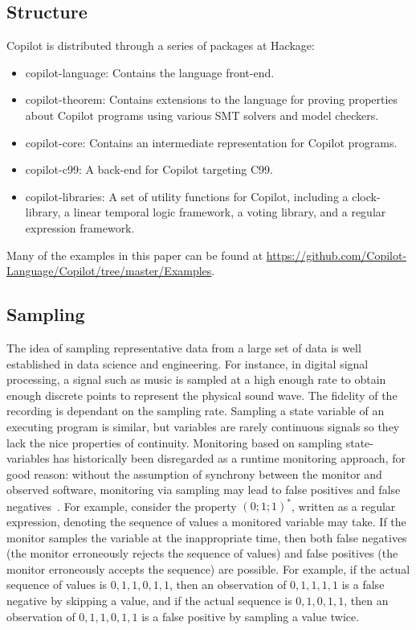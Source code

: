 \subsection{Structure} \label{structure}

\noindent Copilot is distributed through a series of packages at Hackage:

\begin{itemize}
\item copilot-language: Contains the language front-end.
\item copilot-theorem: Contains extensions to the language for proving
properties about Copilot programs using various SMT solvers and model checkers.
\item copilot-core: Contains an intermediate representation for Copilot programs.
\item copilot-c99: A back-end for Copilot targeting C99.
\item copilot-libraries: A set of utility functions for Copilot, including a
clock-library, a linear temporal logic framework, a voting library, and a regular
expression framework.
\end{itemize}

Many of the examples in this paper can be found at
\url{https://github.com/Copilot-Language/Copilot/tree/master/Examples}.

\subsection{Sampling} \label{sampling}
The idea of sampling representative data from a large set of data  is well
established in data science and engineering. For instance, in digital
signal processing, a signal such as music is sampled at a high enough
rate to obtain enough discrete points to represent the physical sound
wave. The fidelity of the recording is dependant on the sampling
rate. Sampling a state variable of an executing program is similar,
but variables are rarely continuous signals so they lack the nice
properties of continuity.
Monitoring based on sampling state-variables has historically been disregarded
as a runtime monitoring approach, for good reason: without the assumption of
synchrony between the monitor and observed software, monitoring via sampling may
lead to false positives and false negatives~\cite{DwyerDE08}.  For example,
consider the property $(0;1;1)^*$, written as a regular expression, denoting the
sequence of values a monitored variable may take.  If the monitor samples the
variable at the inappropriate time, then both false negatives (the monitor
erroneously rejects the sequence of values) and false positives (the monitor
erroneously accepts the sequence) are possible.  For example, if the actual
sequence of values is $0,1,1,0,1,1$, then an observation of $0,1,1,1,1$ is a
false negative by skipping a value, and if the actual sequence is $0,1,0,1,1$,
then an observation of $0,1,1,0,1,1$ is a false positive by sampling a value
twice.




